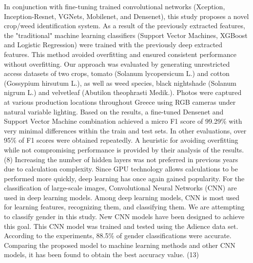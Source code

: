 \documentclass[conference]{IEEEtran}
\begin{document}
In conjunction with fine-tuning trained convolutional networks (Xception, Inception-Resnet, VGNets, Mobilenet, and Densenet), this study proposes a novel crop/weed identification system. As a result of the previously extracted features, the "traditional" machine learning classifiers (Support Vector Machines, XGBoost and Logistic Regression) were trained with the previously deep extracted features. This method avoided overfitting and ensured consistent performance without overfitting. Our approach was evaluated by generating unrestricted access datasets of two crops, tomato (Solanum lycopersicum L.) and cotton (Gossypium hirsutum L.), as well as weed species, black nightshade (Solanum nigrum L.) and velvetleaf (Abutilon theophrasti Medik.). Photos were captured at various production locations throughout Greece using RGB cameras under natural variable lighting. Based on the results, a fine-tuned Densenet and Support Vector Machine combination achieved a micro F1 score of 99.29\% with very minimal differences within the train and test sets. In other evaluations, over 95\% of F1 scores were obtained repeatedly. A heuristic for avoiding overfitting while not compromising performance is provided by their analysis of the results. (8) Increasing the number of hidden layers was not preferred in previous years due to calculation complexity. Since GPU technology allows calculations to be performed more quickly, deep learning has once again gained popularity. For the classification of large-scale images, Convolutional Neural Networks (CNN) are used in deep learning models. Among deep learning models, CNN is most used for learning features, recognizing them, and classifying them. We are attempting to classify gender in this study. New CNN models have been designed to achieve this goal. This CNN model was trained and tested using the Adience data set. According to the experiments, 88.5\% of gender classifications were accurate. Comparing the proposed model to machine learning methods and other CNN models, it has been found to obtain the best accuracy value. (13)  
\end{document}
